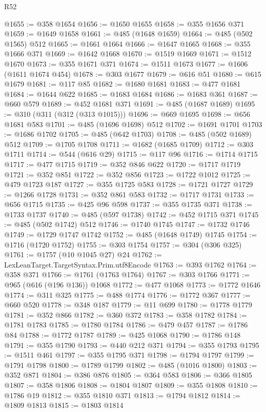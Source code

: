 \begin{lexlean}{R52}
\begin{coremodule}
@1655 := @358 @1654
@1656 := @1650 @1655
@1658 := @355 @1656 @371
@1659 := @1649 @1658
@1661 := @485 (@1648 @1659)
@1664 := @485 (@502 @1565) @512
@1665 := @1661 @1664
@1666 := @1647 @1665
@1668 := @355 @1666 @371
@1669 := @1642 @1668
@1670 := @1519 @1669
@1671 := @1512 @1670
@1673 := @355 @1671 @371
@1674 := @1511 @1673
@1677 := @1606 (@1611 @1674 @454)
@1678 := @303 @1677
@1679 := @616 @51
@1680 := @615 @1679
@1681 := @117 @85
@1682 := @1680 @1681
@1683 := @477 @1681
@1684 := @1644 @622
@1685 := @1683 @1684
@1686 := @1683 @361
@1687 := @660 @579
@1689 := @452 @1681 @371
@1691 := @485 (@1687 @1689)
@1695 := @310 (@311 (@312 (@313 @1015)))
@1696 := @669 @1695
@1698 := @656 @1681 @583
@1701 := @485 (@1696 @1698) @512
@1702 := @1691 @1701
@1703 := @1686 @1702
@1705 := @485 (@642 @1703)
@1708 := @485 (@502 @1689) @512
@1709 := @1705 @1708
@1711 := @1682 (@1685 @1709)
@1712 := @303 @1711
@1714 := @544 (@616 @29)
@1715 := @117 @96
@1716 := @1714 @1715
@1717 := @477 @1715
@1719 := @352 @846 @622
@1720 := @1717 @1719
@1721 := @352 @851
@1722 := @352 @856
@1723 := @1722 @1012
@1725 := @479 @1723 @187
@1727 := @355 @1725 @583
@1728 := @1721 @1727
@1729 := @1266 @1728
@1731 := @352 @861 @583
@1732 := @1717 @1731
@1733 := @656 @1715
@1735 := @425 @96 @598
@1737 := @355 @1735 @371
@1738 := @1733 @1737
@1740 := @485 (@597 @1738)
@1742 := @452 @1715 @371
@1745 := @485 (@502 @1742) @512
@1746 := @1740 @1745
@1747 := @1732 @1746
@1749 := @1729 @1747 @1742
@1752 := @485 (@1648 @1749) @1745
@1754 := @1716 (@1720 @1752)
@1755 := @303 @1754
@1757 := @304 (@306 @325)
@1761 := @1757 (@10 @1045 @27) @24
@1762 := LexLeanTarget.TargetSyntax.Prim.utf8Encode
@1763 := @393 @1762
@1764 := @358 @371
@1766 := @1761 (@1763 @1764)
@1767 := @303 @1766
@1771 := @965 (@616 (@196 @136)) @1068
@1772 := @477 @1068
@1773 := @1772 @1646
@1774 := @311 @325
@1775 := @488 @1774
@1776 := @1772 @367
@1777 := @660 @520
@1778 := @348 @187
@1779 := @11 @699
@1780 := @1778 @1779
@1781 := @352 @866
@1782 := @360 @372
@1783 := @358 @1782
@1784 := @1781 @1783
@1785 := @1780 @1784
@1786 := @479 @457
@1787 := @1786 @84
@1788 := @1772 @1787
@1789 := @425 @1068
@1790 := @1786 @148
@1791 := @355 @1790
@1793 := @440 @212 @371
@1794 := @355 @1793
@1795 := @1511 @461
@1797 := @355 @1795 @371
@1798 := @1794 @1797
@1799 := @1791 @1798
@1800 := @1789 @1799
@1802 := @485 (@1016 @1800)
@1803 := @352 @871
@1804 := @386 @876
@1805 := @364 @583
@1806 := @366 @1805
@1807 := @358 @1806
@1808 := @1804 @1807
@1809 := @355 @1808
@1810 := @1786 @19
@1812 := @355 @1810 @371
@1813 := @1794 @1812
@1814 := @1809 @1813
@1815 := @1803 @1814

\end{coremodule}
\end{lexlean}

